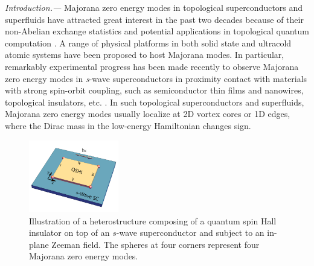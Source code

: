 \documentclass[twocolumn,prl,floatfix,citeautoscript,nofootinbib,superscriptaddress]{revtex4}
\begin{document}
{\color{blue}\emph{Introduction.{---}}} Majorana zero energy modes in
topological superconductors and superfluids \cite%
{Hansan2010,Qix2011,Elliott2015,Ramon2017} have attracted great interest in
the past two decades because of their non-Abelian exchange statistics and
potential applications in topological quantum computation \cite%
{Kitaev2003,Nayak2008}. A range of physical platforms \cite%
{Oppen2010,Lutchyn2010,Alicea2011,Jiang2011,Alicea2012,Tewari2012,Fu2008,zhang2008,Sato2009,Buhler2014,Ortiz2018,Varona2018}
in both solid state and ultracold atomic systems have been proposed to host
Majorana modes. In particular, remarkably experimental progress has been
made recently to observe Majorana zero energy modes in \textit{s}-wave
superconductors in proximity contact with materials with strong spin-orbit
coupling, such as semiconductor thin films and nanowires, topological
insulators, etc. \cite%
{Mourik2012,Finck2013,Nadj2014,Xuj2015,Wang2016,Heq2017}. In such
topological superconductors and superfluids, Majorana zero energy modes
usually localize at 2D vortex cores or 1D edges, where the Dirac mass in the
low-energy Hamiltonian changes sign.

\begin{figure}[t]
\centering\includegraphics[width=0.35\textwidth]{Fig1.pdf}
\caption{Illustration of a heterostructure composing of a quantum spin Hall
insulator on top of an $s$-wave superconductor and subject to an in-plane
Zeeman field. The spheres at four corners represent four Majorana zero
energy modes.}
\label{Fig1}
\end{figure}
\end{document}
